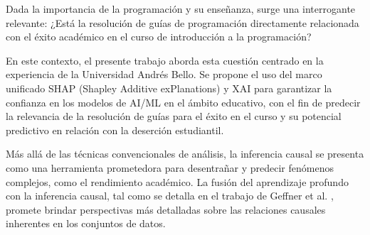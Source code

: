 Dada la importancia de la programación y su enseñanza, surge una interrogante relevante: ¿Está la resolución de guías de programación directamente relacionada con el éxito académico en el curso de introducción a la programación?

En este contexto, el presente trabajo aborda esta cuestión centrado en la experiencia de la Universidad Andrés Bello. Se propone el uso del marco unificado SHAP (Shapley Additive exPlanations) y XAI para garantizar la confianza en los modelos de AI/ML en el ámbito educativo, con el fin de predecir la relevancia de la resolución de guías para el éxito en el curso y su potencial predictivo en relación con la deserción estudiantil.

Más allá de las técnicas convencionales de análisis, la inferencia causal se presenta como una herramienta prometedora para desentrañar y predecir fenómenos complejos, como el rendimiento académico. La fusión del aprendizaje profundo con la inferencia causal, tal como se detalla en el trabajo de Geffner et al. \cite{geffner2022deep}, promete brindar perspectivas más detalladas sobre las relaciones causales inherentes en los conjuntos de datos.
